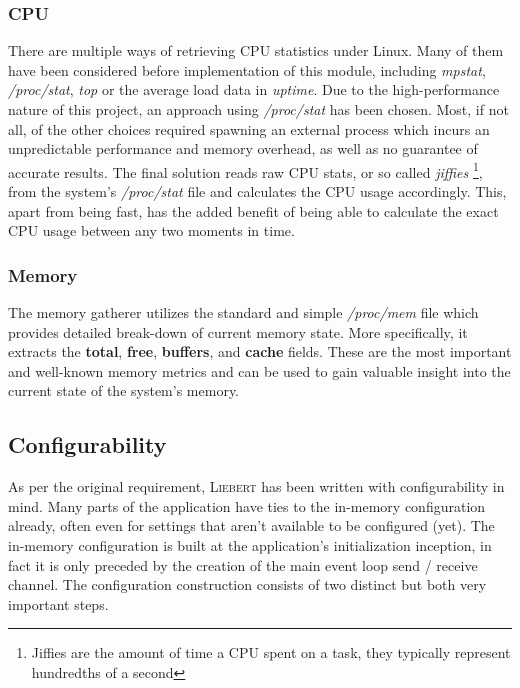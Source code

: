         \subsubsection{CPU}
            There are multiple ways of retrieving CPU statistics under Linux. Many of them have been considered before implementation of this module, including \textit{mpstat}, \textit{/proc/stat}, \textit{top} or the average load data in \textit{uptime}. Due to the high-performance nature of this project, an approach using \textit{/proc/stat} has been chosen. Most, if not all, of the other choices required spawning an external process which incurs an unpredictable performance and memory overhead, as well as no guarantee of accurate results. The final solution reads raw CPU stats, or so called \textit{jiffies} \footnote{Jiffies are the amount of time a CPU spent on a task, they typically represent hundredths of a second}, from the system's \textit{/proc/stat} file and calculates the CPU usage accordingly. This, apart from being fast, has the added benefit of being able to calculate the exact CPU usage between any two moments in time.
        
        \subsubsection{Memory}
            The memory gatherer utilizes the standard and simple \textit{/proc/mem} file which provides detailed break-down of current memory state. More specifically, it extracts the \textbf{total}, \textbf{free}, \textbf{buffers}, and \textbf{cache} fields. These are the most important and well-known memory metrics and can be used to gain valuable insight into the current state of the system's memory.
        
    \subsection{Configurability}\label{sec:config}
        As per the original requirement, \textsc{Liebert} has been written with configurability in mind. Many parts of the application have ties to the in-memory configuration already, often even for settings that aren't available to be configured (yet). The in-memory configuration is built at the application's initialization inception, in fact it is only preceded by the creation of the main event loop send / receive channel. The configuration construction consists of two distinct but both very important steps.
        
